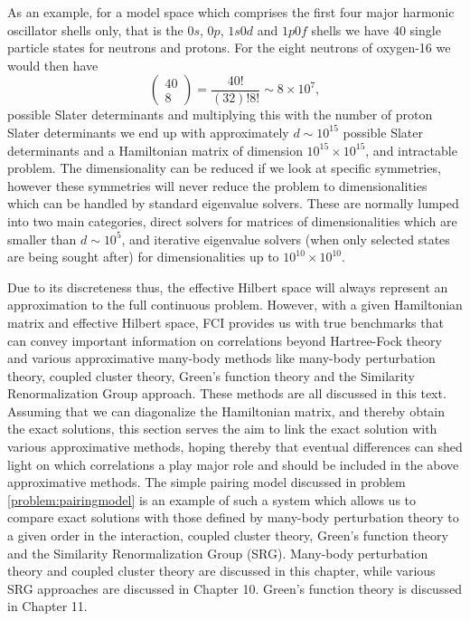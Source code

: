 As an example,  for a model space which comprises the first four major harmonic oscillator shells only, that is the  $0s$, $0p$, $1s0d$ and $1p0f$ shells we have $40$ single particle states for neutrons and protons.  For the eight neutrons of oxygen-16 we would then have
\[
\left (\begin{array}{c} 40 \\ 8\end{array} \right) =\frac{40!}{(32)!8!}\sim 8\times 10^{7}, 
\]
possible Slater determinants 
and multiplying this with the number of proton Slater determinants we end up with approximately  $d\sim 10^{15}$ possible Slater determinants and a Hamiltonian matrix of dimension $10^{15}\times 10^{15}$, and intractable problem. The dimensionality can be reduced if we look at specific symmetries, however these symmetries will never reduce the problem to dimensionalities which can be handled by  standard eigenvalue solvers. These are normally lumped into two main categories, direct solvers 
for matrices of dimensionalities  which are smaller than $d\sim 10^5$, and iterative eigenvalue solvers (when only selected states are being sought after) for dimensionalities up to $10^{10}\times 10^{10}$. 

Due to its discreteness thus, the effective Hilbert space will always
represent an approximation to the full continuous problem.  However,
with a given Hamiltonian matrix and effective Hilbert space, FCI
provides us with true benchmarks that can convey important information
on correlations beyond Hartree-Fock theory and various approximative
many-body methods like many-body perturbation theory, coupled cluster
theory, Green's function theory and the Similarity Renormalization
Group approach. These methods are all discussed in this text.
Assuming that we can diagonalize the Hamiltonian matrix, and thereby
obtain the exact solutions, this section serves the aim to link the
exact solution with various approximative methods, hoping thereby that
eventual differences can shed light on which correlations a play major
role and should be included in the above approximative methods. The
simple pairing model discussed in problem \ref{problem:pairingmodel}
is an example of such a system which allows us to compare exact
solutions with those defined by many-body perturbation theory to a
given order in the interaction, coupled cluster theory, Green's
function theory and the Similarity Renormalization Group
(SRG). Many-body perturbation theory and coupled cluster theory are
discussed in this chapter, while various SRG approaches are discussed
in Chapter 10. Green's function theory is discussed in Chapter 11.

